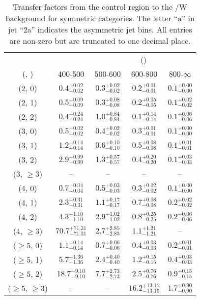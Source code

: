 \begin{table}[h!]
\tiny
\centering
\caption{Transfer factors from the \gj control region to the \ttbar/W background for symmetric categories. The letter ``a'' in jet \eg ``2a''  indicates the asymmetric jet bins. All entries are non-zero but are truncated to one decimal place.\label{tab:tf_gj_ttw_sym}}
\begin{tabular}
{ccccc}
	\hline\hline
&	& \multicolumn{4}{c}{\scalht (\gev)} \\ 
	 (\njet,  \nb) & 400-500 & 500-600 & 600-800 & 800-$\infty$ \\ [0.8ex] 
\hline
	(2, 0) & $0.4^{+ 0.02 }_{- 0.02 }$ & $0.3^{+ 0.02 }_{- 0.02 }$ & $0.2^{+ 0.01 }_{- 0.01 }$ & $0.1^{+ 0.00 }_{- 0.00 }$ \\[0.5ex] 
	(2, 1) & $0.5^{+ 0.09 }_{- 0.09 }$ & $0.3^{+ 0.08 }_{- 0.08 }$ & $0.2^{+ 0.05 }_{- 0.05 }$ & $0.1^{+ 0.02 }_{- 0.02 }$ \\[0.5ex] 
	(2, 2) & $0.4^{+ 0.24 }_{- 0.24 }$ & $1.0^{+ 0.84 }_{- 0.84 }$ & $0.1^{+ 0.14 }_{- 0.14 }$ & $0.1^{+ 0.06 }_{- 0.06 }$ \\[0.5ex] 
	(3, 0) & $0.5^{+ 0.02 }_{- 0.02 }$ & $0.4^{+ 0.02 }_{- 0.02 }$ & $0.3^{+ 0.01 }_{- 0.01 }$ & $0.1^{+ 0.00 }_{- 0.00 }$ \\[0.5ex] 
	(3, 1) & $1.2^{+ 0.14 }_{- 0.14 }$ & $0.6^{+ 0.10 }_{- 0.10 }$ & $0.5^{+ 0.08 }_{- 0.08 }$ & $0.1^{+ 0.01 }_{- 0.01 }$ \\[0.5ex] 
	(3, 2) & $2.9^{+ 0.99 }_{- 0.99 }$ & $1.3^{+ 0.57 }_{- 0.57 }$ & $0.4^{+ 0.20 }_{- 0.20 }$ & $0.1^{+ 0.03 }_{- 0.03 }$ \\[0.5ex] 
	(3, $\ge3$) & -- & -- & -- & -- \\[0.5ex] 
	(4, 0) & $0.7^{+ 0.04 }_{- 0.04 }$ & $0.5^{+ 0.03 }_{- 0.03 }$ & $0.3^{+ 0.02 }_{- 0.02 }$ & $0.1^{+ 0.00 }_{- 0.00 }$ \\[0.5ex] 
	(4, 1) & $2.3^{+ 0.31 }_{- 0.31 }$ & $1.1^{+ 0.17 }_{- 0.17 }$ & $0.7^{+ 0.08 }_{- 0.08 }$ & $0.2^{+ 0.02 }_{- 0.02 }$ \\[0.5ex] 
	(4, 2) & $4.3^{+ 1.10 }_{- 1.10 }$ & $2.9^{+ 1.02 }_{- 1.02 }$ & $0.8^{+ 0.25 }_{- 0.25 }$ & $0.2^{+ 0.06 }_{- 0.06 }$ \\[0.5ex] 
	(4, $\ge3$) & $70.7^{+ 71.31 }_{- 71.31 }$ & $2.7^{+ 2.85 }_{- 2.85 }$ & $1.1^{+ 1.21 }_{- 1.21 }$ & -- \\[0.5ex] 
	($\ge5$, 0) & $1.1^{+ 0.14 }_{- 0.14 }$ & $0.7^{+ 0.06 }_{- 0.06 }$ & $0.4^{+ 0.03 }_{- 0.03 }$ & $0.2^{+ 0.01 }_{- 0.01 }$ \\[0.5ex] 
	($\ge5$, 1) & $5.7^{+ 1.36 }_{- 1.36 }$ & $2.4^{+ 0.40 }_{- 0.40 }$ & $1.2^{+ 0.15 }_{- 0.15 }$ & $0.4^{+ 0.03 }_{- 0.03 }$ \\[0.5ex] 
	($\ge5$, 2) & $18.7^{+ 9.10 }_{- 9.10 }$ & $7.7^{+ 2.73 }_{- 2.73 }$ & $2.5^{+ 0.76 }_{- 0.76 }$ & $0.9^{+ 0.15 }_{- 0.15 }$ \\[0.5ex] 
	($\ge5$, $\ge3$) & -- & -- & $16.2^{+ 13.15 }_{- 13.15 }$ & $1.7^{+ 0.90 }_{- 0.90 }$ \\[0.5ex] 
	\hline
	\hline
\end{tabular}
\end{table}
